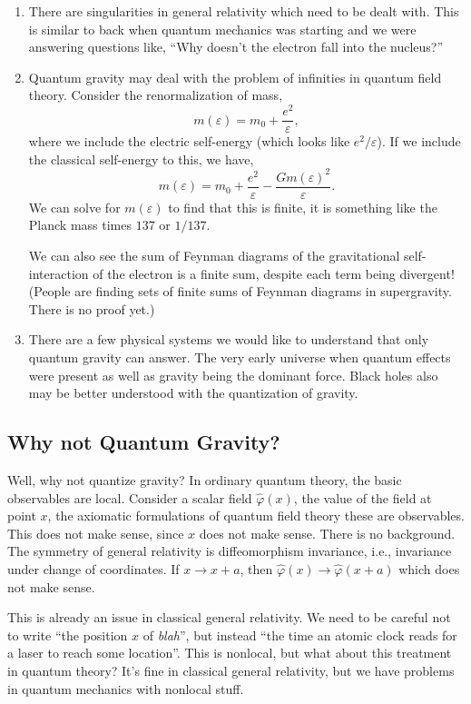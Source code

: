 \begin{enumerate}
\item There are singularities in general relativity which need to be
  dealt with. This is similar to back when quantum mechanics was
  starting and we were answering questions like, ``Why doesn't the
  electron fall into the nucleus?''

\item Quantum gravity may deal with the problem of infinities in quantum
  field theory. Consider the renormalization of mass,
\begin{equation}
m(\varepsilon) = m_{0} + \frac{e^{2}}{\varepsilon},
\end{equation}
where we include the electric self-energy (which looks like
$e^{2}/\varepsilon$). If we include the classical self-energy to this,
we have,
\begin{equation}
  m(\varepsilon)
  = m_{0} + \frac{e^{2}}{\varepsilon} - \frac{Gm(\varepsilon)^{2}}{\varepsilon}.
\end{equation}
We can solve for $m(\varepsilon)$ to find that this is finite, it is
something like the Planck mass times $137$ or $1/137$.

We can also see the sum of Feynman diagrams of the gravitational
self-interaction of the electron is a finite sum, despite each term
being divergent! (People are finding sets of finite sums of Feynman
diagrams in supergravity. There is no proof yet.)

\item There are a few physical systems we would like to understand that
  only quantum gravity can answer. The very early universe when quantum
  effects were present as well as gravity being the dominant
  force. Black holes also may be better understood with the quantization
  of gravity.
\end{enumerate}

\subsection{Why not Quantum Gravity?}

Well, why not quantize gravity? In ordinary quantum theory, the basic
observables are local.  Consider a scalar field $\widehat{\varphi}(x)$,
the value of the field at point $x$, the axiomatic formulations of
quantum field theory these are observables.  This does not make sense,
since $x$ does not make sense.  There is no background. The symmetry of
general relativity is diffeomorphism invariance, i.e., invariance under
change of coordinates.  If $x\to x+a$, then
$\widehat{\varphi}(x)\to\widehat{\varphi}(x+a)$ which does not make
sense.

This is already an issue in classical general relativity.  We need to be
careful not to write ``the position $x$ of \emph{blah}'', but instead
``the time an atomic clock reads for a laser to reach some location''.
This is nonlocal, but what about this treatment in quantum theory?  It's
fine in classical general relativity, but we have problems in quantum
mechanics with nonlocal stuff.
